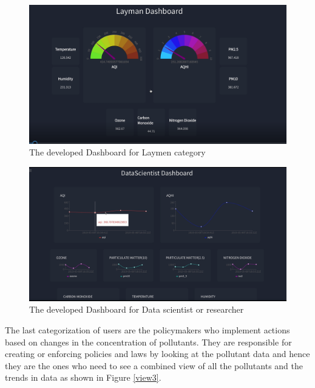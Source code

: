 \hspace{1 cm}
\begin{figure}[h]
  \begin{center}
  \includegraphics[scale=0.50]{./images/figure14.png}
  \end{center}
  \caption{The developed Dashboard for Laymen category}
  \label{view1}
\end{figure}

\hspace{1 cm}



\hspace{1 cm}
\begin{figure}[h]
  \begin{center}
  \includegraphics[scale=0.43]{./images/figure15.png}
  \end{center}
  \caption{The developed Dashboard for Data scientist or researcher}
  \label{view2}
\end{figure}


\hspace{1 cm}

The last categorization of users are the policymakers who implement actions based on changes in the concentration of pollutants. They are responsible for creating or enforcing policies and laws by looking at the pollutant data and hence they are the ones who need to see a combined view of all the pollutants and the trends in data as shown in Figure \ref{view3}.

